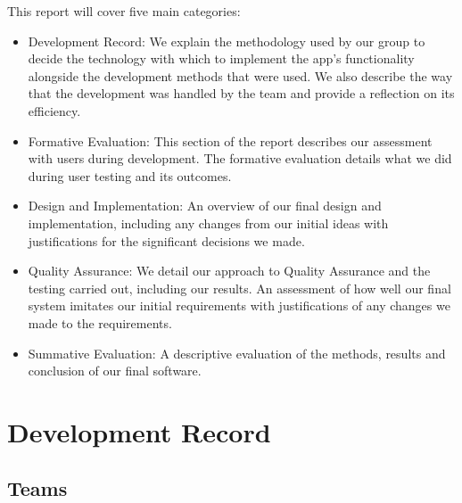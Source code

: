 \documentclass[12pt,a4paper]{article}
\begin{document}
      This report will cover five main categories:

      \begin{itemize}
        \item {Development Record}:
          We explain the methodology used by our group to decide the technology with which to implement the app’s functionality alongside the development methods that were used. We also describe the way that the development was handled by the team and provide a reflection on its efficiency.

        \item {Formative Evaluation}:
          This section of the report describes our assessment with users during development. The formative evaluation details what we did during user testing and its outcomes.

        \item { Design and Implementation}:
          An overview of our final design and implementation, including any changes from our initial ideas with justifications for the significant decisions we made.

        \item { Quality Assurance}:
          We detail our approach to Quality Assurance and the testing carried out, including our results. An assessment of how well our final system imitates our initial requirements with justifications of any changes we made to the requirements.

        \item { Summative Evaluation}:
          A descriptive evaluation of the methods, results and conclusion of our final software.
      \end{itemize}

    \section{Development Record}
      \subsection{Teams} 
\end{document}
